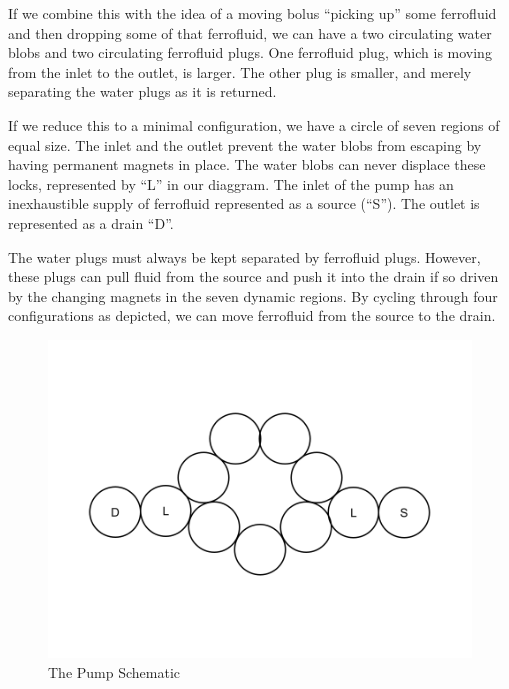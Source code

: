 \documentclass[12pt]{article}
\begin{document}
If we combine this with the idea of a moving bolus ``picking up'' some ferrofluid
and then dropping some of that ferrofluid, we can have a two circulating water blobs
and two circulating ferrofluid plugs. One ferrofluid plug, which is moving from the
inlet to the outlet, is larger.
The other plug is smaller, and merely separating the water plugs as it is returned.

If we reduce this to a minimal configuration, we have a circle of seven regions
of equal size. The inlet and the outlet prevent the water blobs from escaping by
having permanent magnets in place. The water blobs can never displace these
locks, represented by ``L'' in our diaggram. The inlet of the pump has an
inexhaustible supply of ferrofluid represented as a source (``S''). The
outlet is represented as a drain ``D''.

The water plugs must always be kept separated by ferrofluid plugs. However,
these plugs can pull fluid from the source and push it into the drain if
so driven by the changing magnets in the seven dynamic regions.
By cycling through four configurations as depicted, we can move ferrofluid
from the source to the drain.




\begin{figure}
\centerline{\includegraphics[width=5in]{images/Ferrofluid Pump.png}}
\caption{The Pump Schematic}
\label{fig_pumpschematic}
\end{figure}
\end{document}
